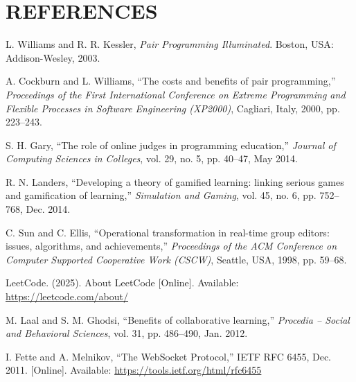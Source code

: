 \chapter*{REFERENCES}

\begin{enumerate}[label={[\arabic*]}, leftmargin=1.5cm, labelsep=0.5cm, itemsep=0.3cm]

\item L. Williams and R. R. Kessler, \textit{Pair Programming Illuminated}. Boston, USA: Addison-Wesley, 2003.

\item A. Cockburn and L. Williams, ``The costs and benefits of pair programming,'' \textit{Proceedings of the First International Conference on Extreme Programming and Flexible Processes in Software Engineering (XP2000)}, Cagliari, Italy, 2000, pp. 223--243.

\item S. H. Gary, ``The role of online judges in programming education,'' \textit{Journal of Computing Sciences in Colleges}, vol. 29, no. 5, pp. 40--47, May 2014.

\item R. N. Landers, ``Developing a theory of gamified learning: linking serious games and gamification of learning,'' \textit{Simulation and Gaming}, vol. 45, no. 6, pp. 752--768, Dec. 2014.

\item C. Sun and C. Ellis, ``Operational transformation in real-time group editors: issues, algorithms, and achievements,'' \textit{Proceedings of the ACM Conference on Computer Supported Cooperative Work (CSCW)}, Seattle, USA, 1998, pp. 59--68.

\item LeetCode. (2025). About LeetCode [Online]. Available: \url{https://leetcode.com/about/}

\item M. Laal and S. M. Ghodsi, ``Benefits of collaborative learning,'' \textit{Procedia -- Social and Behavioral Sciences}, vol. 31, pp. 486--490, Jan. 2012.

\item I. Fette and A. Melnikov, ``The WebSocket Protocol,'' IETF RFC 6455, Dec. 2011. [Online]. Available: \url{https://tools.ietf.org/html/rfc6455}


\end{enumerate}
